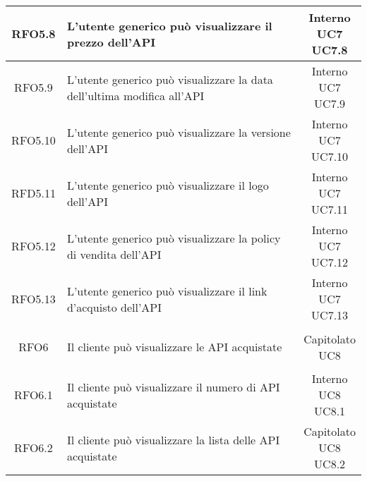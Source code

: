 \begin{longtable}{|c|p{8cm}|c|}
\hypertarget{RFO5.8}{RFO5.8} & L'utente generico può visualizzare il prezzo dell'API & \makecell*{Interno\\UC7\\UC7.8} \\
\hline
\hypertarget{RFO5.9}{RFO5.9} & L'utente generico può visualizzare la data dell'ultima modifica all'API & \makecell*{Interno\\UC7\\UC7.9} \\
\hline
\hypertarget{RFO5.10}{RFO5.10} & L'utente generico può visualizzare la versione dell'API & \makecell*{Interno\\UC7\\UC7.10} \\
\hline
\hypertarget{RFD5.11}{RFD5.11} & L'utente generico può visualizzare il logo dell'API & \makecell*{Interno\\UC7\\UC7.11} \\
\hline
\hypertarget{RFO5.12}{RFO5.12} & L'utente generico può visualizzare la policy di vendita dell'API & \makecell*{Interno\\UC7\\UC7.12} \\
\hline
\hypertarget{RFO5.13}{RFO5.13} & L'utente generico può visualizzare il link d'acquisto dell'API & \makecell*{Interno\\UC7\\UC7.13} \\
\hline

\hypertarget{RFO6}{RFO6} & Il cliente può visualizzare le API acquistate & \makecell*{Capitolato\\UC8} \\
\hline

\hypertarget{RFO6.1}{RFO6.1} & Il cliente può visualizzare il numero di API acquistate & \makecell*{Interno\\UC8\\UC8.1} \\
\hline

\hypertarget{RFO6.2}{RFO6.2} & Il cliente può visualizzare la lista delle API acquistate & \makecell*{Capitolato\\UC8\\UC8.2} \\
\hline


\end{longtable}
